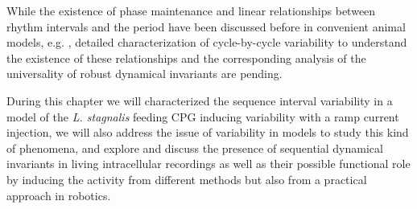 While the existence of phase maintenance and linear relationships between rhythm intervals and the period have been discussed before in convenient animal models, e.g. \cite{grillner_generation_1976,hooper_phase_1997,vavoulis_dynamic_2007}, detailed characterization of cycle-by-cycle variability to understand the existence of these relationships and the corresponding analysis of the universality of robust dynamical invariants are pending.

During this chapter we will characterized the sequence interval variability in a model of the \textit{L. stagnalis} feeding CPG inducing variability with a ramp current injection, we will also address the issue of variability in models to study this kind of phenomena, and explore and discuss the presence of sequential dynamical invariants in living intracellular recordings as well as their possible functional role by inducing the activity from different methods but also from a practical approach in robotics. 


